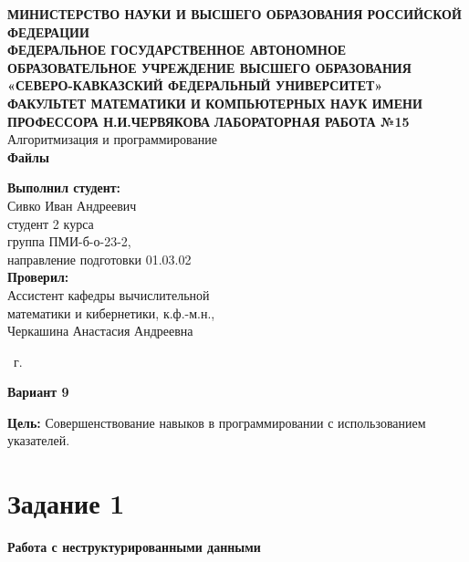\documentclass[14pt,a4paper]{article}
\begin{document}
\begin{titlepage}
  \begin{center}
    {\large\scshape\bfseries
    МИНИСТЕРСТВО НАУКИ И ВЫСШЕГО ОБРАЗОВАНИЯ РОССИЙСКОЙ ФЕДЕРАЦИИ\\
    ФЕДЕРАЛЬНОЕ ГОСУДАРСТВЕННОЕ АВТОНОМНОЕ ОБРАЗОВАТЕЛЬНОЕ УЧРЕЖДЕНИЕ ВЫСШЕГО ОБРАЗОВАНИЯ\\
    «СЕВЕРО-КАВКАЗСКИЙ ФЕДЕРАЛЬНЫЙ УНИВЕРСИТЕТ»\\
    ФАКУЛЬТЕТ МАТЕМАТИКИ И КОМПЬЮТЕРНЫХ НАУК ИМЕНИ ПРОФЕССОРА Н.И.ЧЕРВЯКОВА}
    \vfill
    \Large{\textbf{ЛАБОРАТОРНАЯ РАБОТА №15}}\\[2mm]
    \large{Алгоритмизация и программирование}\\[6mm]
    \large{\textbf{Файлы}}\\[20mm]
  \end{center}
  \begin{flushright}
    \textbf{Выполнил студент:}\\
    Сивко Иван Андреевич\\
    студент 2 курса\\
    группа ПМИ-б-о-23-2,\\
    направление подготовки 01.03.02\\[5mm]
    \textbf{Проверил:}\\
    Ассистент кафедры вычислительной\\
    математики и кибернетики, к.ф.-м.н.,\\
    Черкашина Анастасия Андреевна
  \end{flushright}
  \vfill
  \begin{center}
    \the\year\ г.
  \end{center}
\end{titlepage}


\begin{center}
  \textbf{Вариант 9}
\end{center}
{\large {\bfseries Цель:} Совершенствование навыков в программировании с использованием\\ указателей.}

\section*{Задание 1}
\textbf{Работа с неструктурированными данными}
\renewcommand{\thesubsection}{\arabic{subsection}} %
\setcounter{subsection}{0} %
\end{document}
